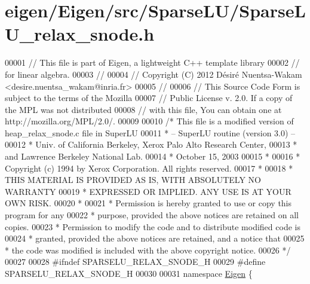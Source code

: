\hypertarget{eigen_2_eigen_2src_2_sparse_l_u_2_sparse_l_u__relax__snode_8h_source}{}\section{eigen/\+Eigen/src/\+Sparse\+L\+U/\+Sparse\+L\+U\+\_\+relax\+\_\+snode.h}
\label{eigen_2_eigen_2src_2_sparse_l_u_2_sparse_l_u__relax__snode_8h_source}

\begin{DoxyCode}
00001 \textcolor{comment}{// This file is part of Eigen, a lightweight C++ template library}
00002 \textcolor{comment}{// for linear algebra.}
00003 \textcolor{comment}{//}
00004 \textcolor{comment}{// Copyright (C) 2012 Désiré Nuentsa-Wakam <desire.nuentsa\_wakam@inria.fr>}
00005 \textcolor{comment}{//}
00006 \textcolor{comment}{// This Source Code Form is subject to the terms of the Mozilla}
00007 \textcolor{comment}{// Public License v. 2.0. If a copy of the MPL was not distributed}
00008 \textcolor{comment}{// with this file, You can obtain one at http://mozilla.org/MPL/2.0/.}
00009 
00010 \textcolor{comment}{/* This file is a modified version of heap\_relax\_snode.c file in SuperLU}
00011 \textcolor{comment}{ * -- SuperLU routine (version 3.0) --}
00012 \textcolor{comment}{ * Univ. of California Berkeley, Xerox Palo Alto Research Center,}
00013 \textcolor{comment}{ * and Lawrence Berkeley National Lab.}
00014 \textcolor{comment}{ * October 15, 2003}
00015 \textcolor{comment}{ *}
00016 \textcolor{comment}{ * Copyright (c) 1994 by Xerox Corporation.  All rights reserved.}
00017 \textcolor{comment}{ *}
00018 \textcolor{comment}{ * THIS MATERIAL IS PROVIDED AS IS, WITH ABSOLUTELY NO WARRANTY}
00019 \textcolor{comment}{ * EXPRESSED OR IMPLIED.  ANY USE IS AT YOUR OWN RISK.}
00020 \textcolor{comment}{ *}
00021 \textcolor{comment}{ * Permission is hereby granted to use or copy this program for any}
00022 \textcolor{comment}{ * purpose, provided the above notices are retained on all copies.}
00023 \textcolor{comment}{ * Permission to modify the code and to distribute modified code is}
00024 \textcolor{comment}{ * granted, provided the above notices are retained, and a notice that}
00025 \textcolor{comment}{ * the code was modified is included with the above copyright notice.}
00026 \textcolor{comment}{ */}
00027 
00028 \textcolor{preprocessor}{#ifndef SPARSELU\_RELAX\_SNODE\_H}
00029 \textcolor{preprocessor}{#define SPARSELU\_RELAX\_SNODE\_H}
00030 
00031 \textcolor{keyword}{namespace }\hyperlink{namespace_eigen}{Eigen} \{

\end{DoxyCode}
